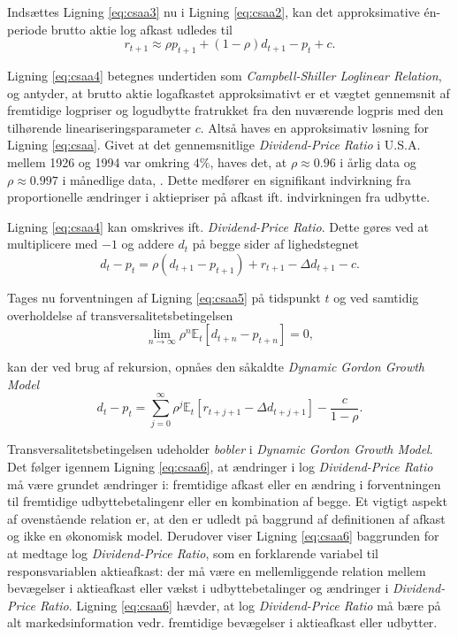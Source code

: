 \documentclass[
  a4paper,
  oneside]{memoir}
\begin{document}
Indsættes Ligning \eqref{eq:csaa3} nu i Ligning \eqref{eq:csaa2}, kan det approksimative én-periode brutto aktie log afkast udledes til
\begin{equation}
r_{t+1}\approx \rho p_{t+1} + (1-\rho)d_{t+1}-p_t+c. \label{eq:csaa4}
\end{equation}

Ligning \eqref{eq:csaa4} betegnes undertiden som \emph{Campbell-Shiller Loglinear Relation}, og antyder, at brutto aktie logafkastet approksimativt er et vægtet gennemsnit af fremtidige logpriser og logudbytte fratrukket fra den nuværende logpris med den tilhørende lineariseringsparameter \(c\). Altså haves en approksimativ løsning for Ligning \eqref{eq:csaa}. Givet at det gennemsnitlige \emph{Dividend-Price Ratio} i U.S.A. mellem 1926 og 1994 var omkring \(4\%\), haves det, at \(\rho\approx 0.96\) i årlig data og \(\rho\approx 0.997\) i månedlige data, \citep{Campbell1997}. Dette medfører en signifikant indvirkning fra proportionelle ændringer i aktiepriser på afkast ift. indvirkningen fra udbytte.

Ligning \eqref{eq:csaa4} kan omskrives ift. \emph{Dividend-Price Ratio}. Dette gøres ved at multiplicere med \(-1\) og addere \(d_t\) på begge sider af lighedstegnet
\begin{equation}
d_t-p_t=\rho(d_{t+1}-p_{t+1}) + r_{t+1} -\Delta d_{t+1}-c. \label{eq:csaa5}
\end{equation}

Tages nu forventningen af Ligning \eqref{eq:csaa5} på tidspunkt \(t\) og ved samtidig overholdelse af transversalitetsbetingelsen
\[\lim_{n\to\infty } \rho^n\mathbb{E}_t[d_{t+n}-p_{t+n}]= 0,\]

kan der ved brug af rekursion, opnåes den såkaldte \emph{Dynamic Gordon Growth Model}
\begin{equation}
d_t-p_t=\sum_{j=0}^\infty \rho^j \mathbb{E}_t[r_{t+j+1}-\Delta d_{t+j+1}]-\frac{c}{1-\rho}. \label{eq:csaa6}
\end{equation}

Transversalitetsbetingelsen udeholder \emph{bobler} i \emph{Dynamic Gordon Growth Model}. Det følger igennem Ligning \eqref{eq:csaa6}, at ændringer i log \emph{Dividend-Price Ratio} må være grundet ændringer i: fremtidige afkast eller en ændring i forventningen til fremtidige udbyttebetalingenr eller en kombination af begge. Et vigtigt aspekt af ovenstående relation er, at den er udledt på baggrund af definitionen af afkast og ikke en økonomisk model. Derudover viser Ligning \eqref{eq:csaa6} baggrunden for at medtage log \emph{Dividend-Price Ratio}, som en forklarende variabel til responsvariablen aktieafkast: der må være en mellemliggende relation mellem bevægelser i aktieafkast eller vækst i udbyttebetalinger og ændringer i \emph{Dividend-Price Ratio}. Ligning \eqref{eq:csaa6} hævder, at log \emph{Dividend-Price Ratio} må bære på alt markedsinformation vedr. fremtidige bevægelser i aktieafkast eller udbytter.
\end{document}
